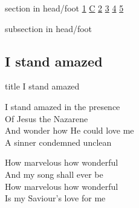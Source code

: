 \documentclass{beamer}
\begin{document}
{
{ 
 {
 \begin{beamercolorbox}[ht=4.5ex,dp=1.5ex,%
      leftskip=.3cm,rightskip=.3cm plus1fil]{section in head/foot}
 \fontsize{12}{25}\selectfont 
\hyperlink{I stand amazed['How marvelous']1}{1}
\hyperlink{I stand amazed['How marvelous']C}{C}
\hyperlink{I stand amazed['How marvelous']2}{2}
\hyperlink{I stand amazed['How marvelous']3}{3}
\hyperlink{I stand amazed['How marvelous']4}{4}
\hyperlink{I stand amazed['How marvelous']5}{5}
 
 \end{beamercolorbox}%
  \begin{beamercolorbox}[ht=2.5ex,dp=1.125ex,%
   leftskip=.3cm,rightskip=.3cm plus1fil]{subsection in head/foot}
   \insertauthor
 \end{beamercolorbox}%
 }
}
\subsection{ I stand amazed }

\hypertarget{I stand amazed['How marvelous']}{}
\begin{frame}{}
 \vfill
  \centering
  \begin{beamercolorbox}[sep=8pt,center,shadow=true,rounded=true]{title}
    I stand amazed     
  \end{beamercolorbox}
  \vfill
\end{frame}

\hypertarget{I stand amazed['How marvelous']1}{}
\begin{frame}{}
\fontsize{ 20 }{ 27 }\selectfont

I stand amazed in the presence\\ 
Of Jesus the Nazarene\\ 
And wonder how He could love me\\ 
A sinner condemned unclean 

\end{frame}

\hypertarget{I stand amazed['How marvelous']C}{}
\begin{frame}{}
\fontsize{ 20 }{ 27 }\selectfont

How marvelous how wonderful\\ 
And my song shall ever be\\ 
How marvelous how wonderful\\ 
Is my Saviour's love for me 


\end{frame}}
\end{document}

